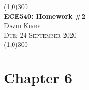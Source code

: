 \documentclass[12pt]{article}
\begin{document}
 	\begin{center}
    \line(1,0){300}\\[0.25cm]
 	\Large{\bfseries ECE540: Homework \#2}\\
 	\textsc{\large David Kirby}\\
 	\textsc{\large Due: 24 September 2020}\\
 	\line(1,0){300}\\[0.75cm]
 	\end{center}


\section*{Chapter 6}
\end{document}
